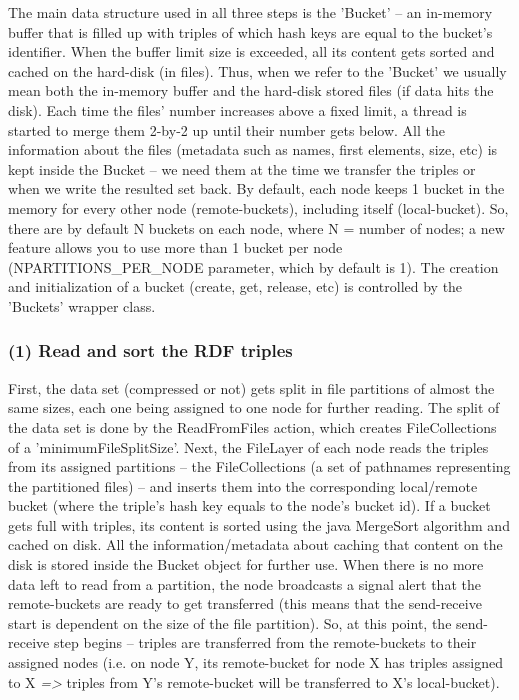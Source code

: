 The main data structure used in all three steps is the 'Bucket' -- an in-memory buffer that is filled up with triples of which hash keys are equal to the bucket's identifier. When the buffer limit size is exceeded, all its content gets sorted and cached on the hard-disk (in files). Thus, when we refer to the 'Bucket' we usually mean both the in-memory buffer and the hard-disk stored files (if data hits the disk). Each time the files' number increases above a fixed limit, a thread is started to merge them 2-by-2 up until their number gets below. All the information about the files (metadata such as names, first elements, size, etc) is kept inside the Bucket -- we need them at the time we transfer the triples or when we write the resulted set back. By default, each node keeps 1 bucket in the memory for every other node (remote-buckets), including itself (local-bucket). So, there are by default N buckets on each node, where N = number of nodes; a new feature allows you to use more than 1 bucket per node (NPARTITIONS\_PER\_NODE parameter, which by default is 1). The creation and initialization of a bucket (create, get, release, etc) is controlled by the 'Buckets' wrapper class.

% 
\subsubsection*{(1) Read and sort the RDF triples}

First, the data set (compressed or not) gets split in file partitions of almost the same sizes, each one being assigned to one node for further reading. The split of the data set is done by the ReadFromFiles action, which creates FileCollections of a 'minimumFileSplitSize'. Next, the FileLayer of each node reads the triples from its assigned partitions -- the FileCollections (a set of pathnames representing the partitioned files) -- and inserts them into the corresponding local/remote bucket (where the triple's hash key equals to the node's bucket id). If a bucket gets full with triples, its content is sorted using the java MergeSort algorithm and cached on disk. All the information/metadata about caching that content on the disk is stored inside the Bucket object for further use. When there is no more data left to read from a partition, the node broadcasts a signal alert that the remote-buckets are ready to get transferred (this means that the send-receive start is dependent on the size of the file partition). So, at this point, the send-receive step begins -- triples are transferred from the remote-buckets to their assigned nodes (i.e. on node Y, its remote-bucket for node X has triples assigned to X \textit{=>} triples from Y's remote-bucket will be transferred to X's local-bucket).

